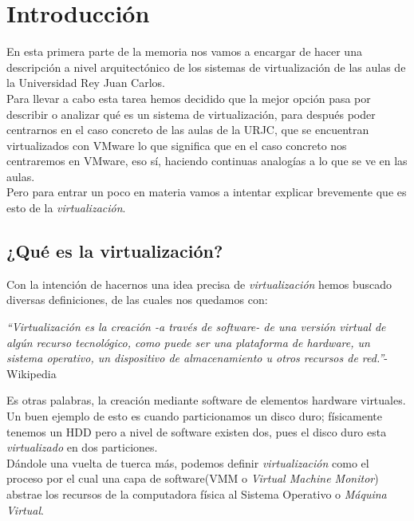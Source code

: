 \chapter{Introducción}
\lettrine[lines=1,slope=4pt,findent=0pt]{E}{}n esta primera parte de la memoria nos vamos a encargar de hacer una descripción a nivel arquitectónico de los sistemas de virtualización de las aulas de la Universidad Rey Juan Carlos.\\

\noindent Para llevar a cabo esta tarea hemos decidido que la mejor opción pasa por describir o analizar qué es un sistema de virtualización, para después poder centrarnos en el caso concreto de las aulas de la URJC, que se encuentran virtualizados con VMware\cite{vmware} lo que significa que en el caso concreto nos centraremos en VMware, eso sí, haciendo continuas analogías a lo que se ve en las aulas.\\

\noindent Pero para entrar un poco en materia vamos a intentar explicar brevemente que es esto de la \emph{virtualización}.

\section{¿Qué es la virtualización?}
\noindent Con la intención de hacernos una idea precisa de \emph{virtualización} hemos buscado diversas definiciones, de las cuales nos quedamos con:
\begin{center}
\emph{\textquotedblleft Virtualización es la creación -a través de software- de una versión virtual de algún recurso tecnológico, como puede ser una plataforma de hardware, un sistema operativo, un dispositivo de almacenamiento u otros recursos de red.\textquotedblright}-Wikipedia\cite{defvirwiki}\\
\end{center}

\noindent Es otras palabras, la creación mediante software de elementos hardware virtuales. Un buen ejemplo de esto es cuando particionamos un disco duro; físicamente tenemos un HDD pero a nivel de software existen dos, pues el disco duro esta \emph{virtualizado} en dos particiones.\\

\noindent Dándole una vuelta de tuerca más, podemos definir \emph{virtualización} como el proceso por el cual una capa de software(VMM o \emph{Virtual Machine Monitor}) abstrae los recursos de la computadora física al Sistema Operativo o \emph{Máquina Virtual}.

